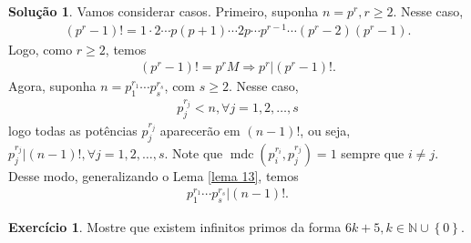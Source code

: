 \documentclass[a4paper,11pt,twoside, leqno]{article}
\DeclareMathOperator{\mdc}{mdc}
\theoremstyle{definition}
\newtheorem{exercise}{Exercício}
\newtheorem*{solution}{Solução}
\begin{document}
\begin{solution}
	Vamos considerar casos. Primeiro, suponha $n = p^r, r\geq 2$. Nesse caso, 
	\begin{align*}
	(p^r - 1)! = 1\cdot 2\cdots p(p+1)\cdots 2p\cdots p^{r-1}\cdots (p^r - 2)(p^r-1).
	\end{align*}
	Logo, como $r\geq 2$, temos
	\begin{align*}
	(p^r - 1)! = p^rM \Rightarrow p^r|(p^r - 1)!.
	\end{align*}
	Agora, suponha $n = p_1^{r_1}\cdots p_s^{r_s}$, com $s\geq 2$. Nesse caso, 
	\begin{align*}
	p_j^{r_j} < n, \forall j = 1,2,\dots,s
	\end{align*}
	logo todas as potências $p_j^{r_j}$ aparecerão em $(n-1)!$, ou seja, $p_j^{r_j}|(n-1)!, \forall j=1,2,\dots,s$. Note que $\mdc(p_i^{r_i}, p_j^{r_j}) = 1$ sempre que $i\neq j$. Desse modo, generalizando o Lema \eqref{lema 13}, temos
	\begin{align*}
	p_1^{r_1}\cdots p_s^{r_s}|(n-1)!.
	\end{align*}
\end{solution}
\begin{exercise}
	Mostre que existem infinitos primos da forma $6k + 5, k\in\mathbb{N}\cup\left\{0\right\}$.
\end{exercise}
\end{document}

